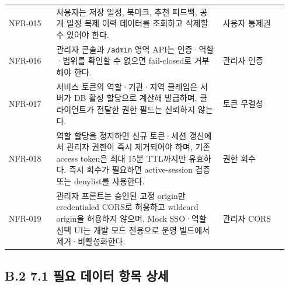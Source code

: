 \documentclass[12pt,a4paper]{article}
\newcommand{\DocNeedspace}[1]{\par\ifdim\dimexpr\pagegoal-\pagetotal\relax<#1\newpage\fi}
\newcommand{\AppendixAnchor}[2]{\hypertarget{app:#1#2}{}}
\begin{document}
\begin{small}
\begin{longtable}{@{}>{\centering\arraybackslash}m{0.160\linewidth}>{\RaggedRight\arraybackslash}m{0.560\linewidth}>{\RaggedRight\arraybackslash}m{0.227\linewidth}@{}}
NFR-015 & 사용자는 저장 일정, 북마크, 추천 피드백, 공개 일정 복제 이력 데이터를 조회하고 삭제할 수 있어야 한다. & 사용자 통제권 \\
NFR-016 & 관리자 콘솔과 \texttt{/\allowbreak{}admin} 영역 API는 인증·역할·범위를 확인할 수 없으면 fail-\allowbreak{}closed로 거부해야 한다. & 관리자 인증 \\
NFR-017 & 서비스 토큰의 역할·기관·지역 클레임은 서버가 DB 활성 할당으로 계산해 발급하며, 클라이언트가 전달한 권한 필드는 신뢰하지 않는다. & 토큰 무결성 \\
NFR-018 & 역할 할당을 정지하면 신규 토큰·세션 갱신에서 관리자 권한이 즉시 제거되어야 하며, 기존 access token은 최대 15분 TTL까지만 유효하다. 즉시 회수가 필요하면 active-\allowbreak{}session 검증 또는 denylist를 사용한다. & 권한 회수 \\
NFR-019 & 관리자 프론트는 승인된 고정 origin만 credentialed CORS로 허용하고 wildcard origin을 허용하지 않으며, Mock SSO·역할 선택 UI는 개발 모드 전용으로 운영 빌드에서 제거·비활성화한다. & 관리자 CORS \\
\bottomrule
\end{longtable}
\end{small}


\newpage
\DocNeedspace{18\baselineskip}
\AppendixAnchor{B}{2}
\subsection*{B.2 7.1 필요 데이터 항목 상세}
\end{document}
